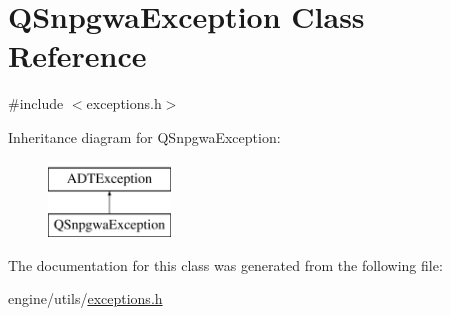 \hypertarget{classQSnpgwaException}{
\section{QSnpgwaException Class Reference}
\label{classQSnpgwaException}
}


{\ttfamily \#include $<$exceptions.h$>$}

Inheritance diagram for QSnpgwaException:\begin{figure}[H]
\begin{center}
\leavevmode
\includegraphics[height=2cm]{classQSnpgwaException}
\end{center}
\end{figure}


The documentation for this class was generated from the following file:\begin{DoxyCompactItemize}
\item 
engine/utils/\hyperlink{exceptions_8h}{exceptions.h}\end{DoxyCompactItemize}
